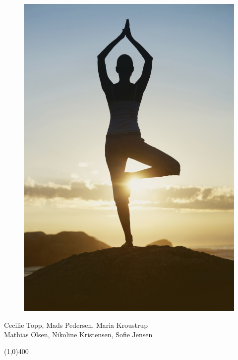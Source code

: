 \begin{figure}[H]
	\centering
	\includegraphics[scale=0.125]{figures/balance.JPG}
\end{figure}

\vspace*{\fill}
	\begin{center}
		Cecilie Topp, Mads Pedersen, Maria Kroustrup\\
		Mathias Olsen, Nikoline Kristensen, Sofie Jensen  
	\end{center}
\begin{center}
\line(1,0){400}
\end{center}
\clearpage